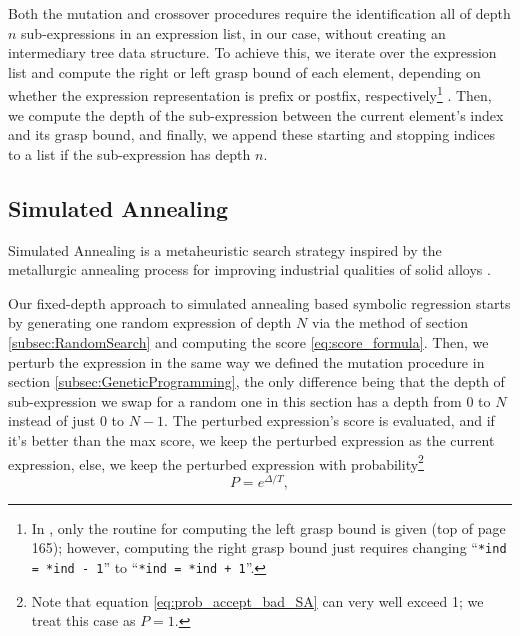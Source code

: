 \documentclass[runningheads]{llncs}
\begin{document}
\par Both the mutation and crossover procedures require the identification all of depth $n$ sub-expressions in an expression list, in our case, without creating an intermediary tree data structure. To achieve this, we iterate over the expression list and compute the right or left grasp bound of each element, depending on whether the expression representation is prefix or postfix, respectively\footnote{In \cite{3ce09117-c08b-3ddb-b2ba-3ea8005b2118}, only the routine for computing the left grasp bound is given (top of page 165); however, computing the right grasp bound just requires changing ``\texttt{*ind = *ind - 1}'' to ``\texttt{*ind = *ind + 1}''.} \cite{3ce09117-c08b-3ddb-b2ba-3ea8005b2118}. Then, we compute the depth of the sub-expression between the current element's index and its grasp bound, and finally, we append these starting and stopping indices to a list if the sub-expression has depth $n$.

\subsection{Simulated Annealing} \label{subsec:SimulatedAnnealing}
Simulated Annealing is a metaheuristic search strategy inspired by the metallurgic annealing process for improving industrial qualities of solid alloys \cite{vanLaarhoven1987} \cite{10.1145/3449639.3459345}. 
\par Our fixed-depth approach to simulated annealing based symbolic regression starts by generating one random expression of depth $N$ via the method of section \ref{subsec:RandomSearch} and computing the score \ref{eq:score_formula}. Then, we perturb the expression in the same way we defined the mutation procedure in section \ref{subsec:GeneticProgramming}, the only difference being that the depth of sub-expression we swap for a random one in this section has a depth from $0$ to $N$ instead of just $0$ to $N-1$. The perturbed expression's score is evaluated, and if it's better than the max score, we keep the perturbed expression as the current expression, else, we keep the perturbed expression with probability\footnote{Note that equation \ref{eq:prob_accept_bad_SA} can very well exceed 1; we treat this case as $P=1$.} \cite{10.1145/3449639.3459345}
\begin{equation}
		P = e^{\Delta/T},  \label{eq:prob_accept_bad_SA}
\end{equation}
\end{document}
